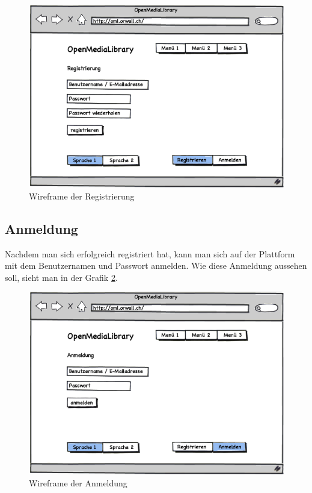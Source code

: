\begin{figure}[ht]
    \begin{center}
        \includegraphics[width=1\textwidth,angle=0]{./wireframes/02_registrierung.png}
        \caption{Wireframe der Registrierung}
        \label{02_registrierung}
    \end{center}
\end{figure}

\clearpage

\subsection{Anmeldung}
Nachdem man sich erfolgreich registriert hat, kann man sich auf der Plattform
mit dem Benutzernamen und Passwort anmelden. Wie diese Anmeldung aussehen soll, sieht
man in der Grafik \ref{03_anmeldung}.

\begin{figure}[ht]
    \begin{center}
        \includegraphics[width=1\textwidth,angle=0]{./wireframes/03_anmeldung.png}
        \caption{Wireframe der Anmeldung}
        \label{03_anmeldung}
    \end{center}
\end{figure}

